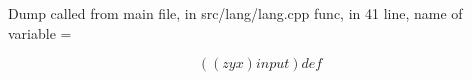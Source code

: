 \documentclass{article}
\begin{document}
Dump called from main file, in src/lang/lang.cpp func, in 41 line, name of variable = 


$$
((zyx) input ) def 
$$
\end{document}
